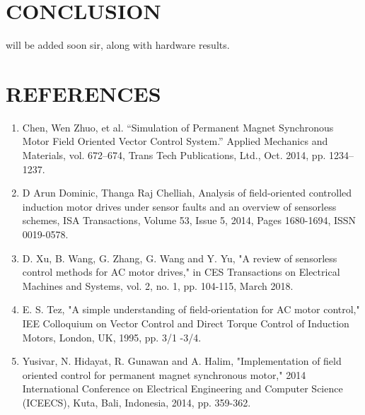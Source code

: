 \section{CONCLUSION}

will be added soon sir, along with hardware results.

\newpage


\section{\centering REFERENCES}


\begin{enumerate}
\item Chen, Wen Zhuo, et al. “Simulation of Permanent Magnet Synchronous Motor Field Oriented Vector Control System.” Applied Mechanics and Materials, vol. 672–674, Trans Tech Publications, Ltd., Oct. 2014, pp. 1234–1237.


\vspace{5mm} %

\item D Arun Dominic, Thanga Raj Chelliah,
Analysis of field-oriented controlled induction motor drives under sensor faults and an overview of sensorless schemes,
ISA Transactions,
Volume 53, Issue 5,
2014,
Pages 1680-1694,
ISSN 0019-0578.

\vspace{5mm} %

\item D. Xu, B. Wang, G. Zhang, G. Wang and Y. Yu, "A review of sensorless control methods for AC motor drives," in CES Transactions on Electrical Machines and Systems, vol. 2, no. 1, pp. 104-115, March 2018.


\vspace{5mm} %

\item  E. S. Tez, "A simple understanding of field-orientation for AC motor control," IEE Colloquium on Vector Control and Direct Torque Control of Induction Motors, London, UK, 1995, pp. 3/1 -3/4.

\vspace{5mm} %


\item  Yusivar, N. Hidayat, R. Gunawan and A. Halim, "Implementation of field oriented control for permanent magnet synchronous motor," 2014 International Conference on Electrical Engineering and Computer Science (ICEECS), Kuta, Bali, Indonesia, 2014, pp. 359-362.

\end{enumerate}
